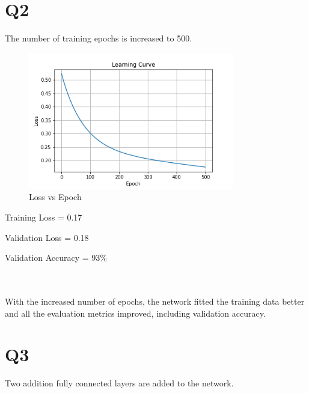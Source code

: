 \documentclass[11pt]{extarticle}
\begin{document}
\pagebreak

\section{Q2}

The number of training epochs is increased to 500.

\begin{figure}[h]
\centering
\includegraphics[width=0.8\textwidth]{Q2.png}
\caption{Loss vs Epoch}\label{fig:Q2}
\end{figure}
\begin{minipage}{0.3\textwidth}
    Training Loss = 0.17
\end{minipage}
\begin{minipage}{0.3\textwidth}
    Validation Loss = 0.18
\end{minipage}
\begin{minipage}{0.3\textwidth}
    Validation Accuracy = 93\%
\end{minipage}
\\
\\
With the increased number of epochs, the network fitted the training data better and all the evaluation metrics improved, including validation accuracy.

\pagebreak

\section{Q3}

Two addition fully connected layers are added to the network.
\end{document}
